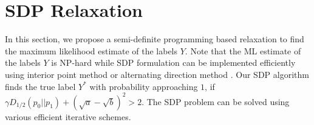 \documentclass[conference]{IEEEtran}
\DeclareMathOperator{\Binom}{Binom}
\begin{document}
	

	
	\section{SDP Relaxation}\label{s:sdp}
	In this section, we propose a semi-definite programming based relaxation to find the maximum likelihood estimate of the labels $Y$. Note that
	the ML estimate of the labels $Y$ is NP-hard while
	SDP formulation can be implemented efficiently using
	interior point method
	or alternating direction method \cite{boyd2011distributed}.
	Our SDP algorithm finds the true label $Y^*$ with probability approaching $1$, if
	$\gamma D_{1/2}(p_0||p_1) + (\sqrt{a} - \sqrt{b})^2 > 2$.
	The SDP problem can be solved using various efficient iterative schemes.
	
\end{document}
